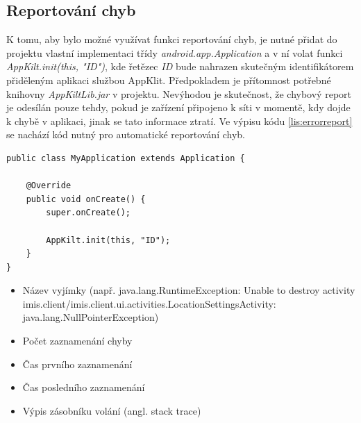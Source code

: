 \documentclass{diplomka}
\begin{document}
\subsection*{Reportování chyb}
K tomu, aby bylo možné využívat funkci reportování chyb, je nutné přidat do projektu vlastní implementaci třídy \emph{android.app.Application} a v ní volat funkci \emph{AppKilt.init(this, "ID")}, kde řetězec \emph{ID} bude nahrazen skutečným identifikátorem přiděleným aplikaci službou AppKlit. Předpokladem je přítomnost potřebné knihovny \emph{AppKiltLib.jar} v projektu. Nevýhodou je skutečnost, že chybový report je odesílán pouze tehdy, pokud je zařízení připojeno k síti v momentě, kdy dojde k chybě v aplikaci, jinak se tato informace ztratí. Ve výpisu kódu \ref{lis:errorreport} se nachází kód nutný pro automatické reportování chyb.
\begin{lstlisting}[label=lis:errorreport, caption=Inicializace reportování chyb] 
public class MyApplication extends Application {

	@Override
	public void onCreate() {
		super.onCreate();
		
		AppKilt.init(this, "ID");
	}
}
\end{lstlisting}

\begin{itemize}[noitemsep,nolistsep]
\item Název vyjímky (např. java.lang.RuntimeException: Unable to destroy activity {imis.client/imis.client.ui.activities.LocationSettingsActivity}: \\java.lang.NullPointerException)
\item Počet zaznamenání chyby
\item Čas prvního zaznamenání
\item Čas posledního zaznamenání
\item Výpis zásobníku volání (angl. stack trace)


\end{itemize}
\end{document}
